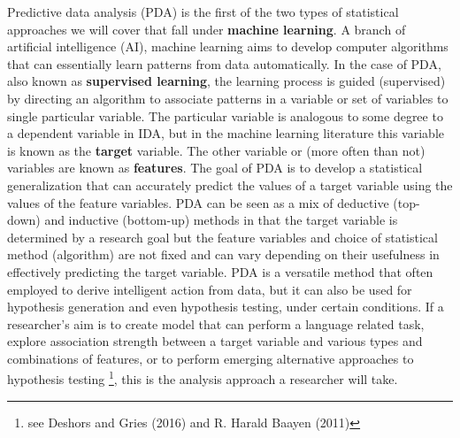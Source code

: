 \documentclass[
  letterpaper,
]{latex/krantz}
\begin{document}
Predictive data analysis (PDA) is the first of the two types of
statistical approaches we will cover that fall under \textbf{machine
learning}. A branch of artificial intelligence (AI), machine learning
aims to develop computer algorithms that can essentially learn patterns
from data automatically. In the case of PDA, also known as
\textbf{supervised learning}, the learning process is guided
(supervised) by directing an algorithm to associate patterns in a
variable or set of variables to single particular variable. The
particular variable is analogous to some degree to a dependent variable
in IDA, but in the machine learning literature this variable is known as
the \textbf{target} variable. The other variable or (more often than
not) variables are known as \textbf{features}. The goal of PDA is to
develop a statistical generalization that can accurately predict the
values of a target variable using the values of the feature variables.
PDA can be seen as a mix of deductive (top-down) and inductive
(bottom-up) methods in that the target variable is determined by a
research goal but the feature variables and choice of statistical method
(algorithm) are not fixed and can vary depending on their usefulness in
effectively predicting the target variable. PDA is a versatile method
that often employed to derive intelligent action from data, but it can
also be used for hypothesis generation and even hypothesis testing,
under certain conditions. If a researcher's aim is to create model that
can perform a language related task, explore association strength
between a target variable and various types and combinations of
features, or to perform emerging alternative approaches to hypothesis
testing \footnote{see Deshors and Gries (2016) and R. Harald Baayen
  (2011)}, this is the analysis approach a researcher will take.
\end{document}
